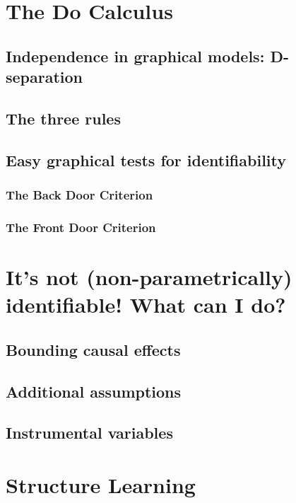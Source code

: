 \documentclass[11pt,a4paper]{article}
\begin{document}
\section{The Do Calculus}
\subsection{Independence in graphical models: D-separation}
\subsection{The three rules}
\subsection{Easy graphical tests for identifiability}
\subsubsection{The Back Door Criterion}
\subsubsection{The Front Door Criterion}


\section{It's not (non-parametrically) identifiable! What can I do?}
\subsection{Bounding causal effects}
\subsection{Additional assumptions}
\subsection{Instrumental variables}


\section{Structure Learning}





\end{document}

